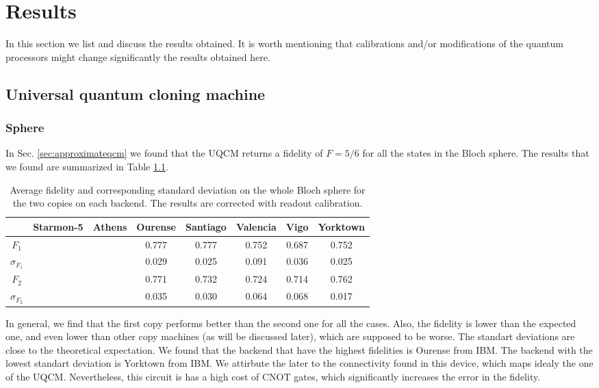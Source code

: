 \chapter{Results}
\label{sec:results}

In this section we list and discuss the results obtained.
It is worth mentioning that calibrations and/or modifications of the quantum processors might change significantly the results obtained here.

\section{Universal quantum cloning machine}
\subsection{Sphere}

In Sec. \ref{sec:approximateqcm} we found that the UQCM returns a fidelity of $F=5/6$ for all the states in the Bloch sphere. The results that we found are summarized in Table \ref{tab:uqcm_results_full_sphere}. 

\begin{table}[H]
    \centering
    \begin{tabular}{|c|c|c|c|c|c|c|c|}
    \hline
    \textbf{} & \textbf{Starmon-5} & \textbf{Athens} & \textbf{Ourense} & \textbf{Santiago} & \textbf{Valencia} & \textbf{Vigo} & \textbf{Yorktown} \\ \hline
    $F_1$              &  &  & 0.777 & 0.777 & 0.752 & 0.687 & 0.752\\ \hline
    $\sigma_{F_1}$     &  &  & 0.029 & 0.025 & 0.091 & 0.036 & 0.025 \\ \hline
    $F_2$              &  &  & 0.771 & 0.732 & 0.724 & 0.714 & 0.762 \\ \hline
    $\sigma_{F_2}$     &  &  & 0.035 & 0.030 & 0.064 & 0.068 & 0.017 \\ \hline
    \end{tabular}
    \caption{Average fidelity and corresponding standard deviation on the whole Bloch sphere for the two copies on each backend. The results are corrected with readout calibration.}\label{tab:uqcm_results_full_sphere}
\end{table}

In general, we find that the first copy performs better than the second one for all the cases. Also, the fidelity is lower than the expected one, and even lower than other copy machines (as will be discussed later), which are supposed to be worse. The standart deviations are close to the theoretical expectation. We found that the backend that have the highest fidelities is Ourense from IBM. The backend with the lowest standart deviation is Yorktown from IBM. We attirbute the later to the connectivity found in this device, which maps idealy the one of the UQCM. Nevertheless, this circuit is has a high cost of CNOT gates, which significantly increases the error in the fidelity.

